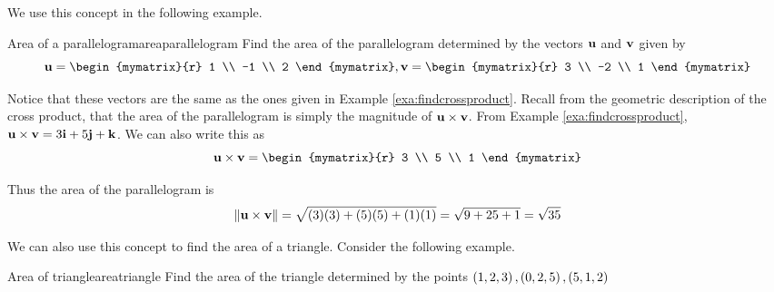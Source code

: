 We use this concept in the following example.

\begin{example}{Area of a parallelogram}{areaparallelogram}
Find the area of the
 parallelogram determined by the vectors ${\bf u}$
and ${\bf v}$ given by 
\begin{equation*}
\vect{u}
=
\begin{mymatrix}{r}
1 \\
-1 \\
2
\end{mymatrix}, 
\vect{v}
=
\begin{mymatrix}{r}
3 \\
-2 \\
1
\end{mymatrix}
\end{equation*}
\end{example}

\begin{solution}
Notice that these vectors are the same as the ones given in Example \ref{exa:findcrossproduct}.
Recall from the geometric description of the cross
product, that the area of the parallelogram is simply the magnitude of ${\bf u} \times {\bf v}$. 
From Example \ref{exa:findcrossproduct}, ${\bf u} \times {\bf v} = 3{\bf i}+5{\bf j}+{\bf k}$.
We can also write this as
\begin{equation*}
\vect{u} \times \vect{v}
=
\begin{mymatrix}{r}
3 \\
5 \\
1
\end{mymatrix}
\end{equation*}

Thus the area of the parallelogram is 
\begin{equation*}
\|{\bf u} \times {\bf v}\| = 
\sqrt{(3)(3) + (5)(5) + (1)(1)} = 
\sqrt{9+25+1}=\sqrt{35}
\end{equation*}
\end{solution}

We can also use this concept to find the area of a triangle. Consider the following
example.

\begin{example}{Area of triangle}{areatriangle}
Find the area of the triangle determined by the points $\left(1, 2, 3 \right) ,
\left(0,2,5\right),
\left(5,1, 2 \right) $ 
\end{example}

